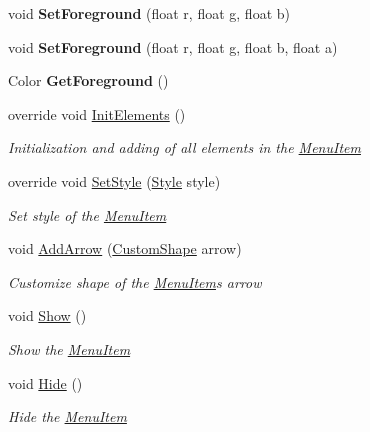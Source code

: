 \begin{DoxyCompactItemize}
void {\bfseries Set\+Foreground} (float r, float g, float b)
\item 
\mbox{\label{class_space_v_i_l_1_1_menu_item_ac29025d8772135b9cdf0e7790e47fe81}} 
void {\bfseries Set\+Foreground} (float r, float g, float b, float a)
\item 
\mbox{\label{class_space_v_i_l_1_1_menu_item_a7aa3ff32dc812b34f88ae7090febd741}} 
Color {\bfseries Get\+Foreground} ()
\item 
override void \mbox{\hyperlink{class_space_v_i_l_1_1_menu_item_a69732e6cf64ca11da0d3beef91e8c086}{Init\+Elements}} ()
\begin{DoxyCompactList}\small\item\em Initialization and adding of all elements in the \mbox{\hyperlink{class_space_v_i_l_1_1_menu_item}{Menu\+Item}} \end{DoxyCompactList}\item 
override void \mbox{\hyperlink{class_space_v_i_l_1_1_menu_item_a836d866b3d92b8217a49ddd19b0a35f5}{Set\+Style}} (\mbox{\hyperlink{class_space_v_i_l_1_1_decorations_1_1_style}{Style}} style)
\begin{DoxyCompactList}\small\item\em Set style of the \mbox{\hyperlink{class_space_v_i_l_1_1_menu_item}{Menu\+Item}} \end{DoxyCompactList}\item 
void \mbox{\hyperlink{class_space_v_i_l_1_1_menu_item_a54c3c774c9108d3bd599b4e464f7fcd1}{Add\+Arrow}} (\mbox{\hyperlink{class_space_v_i_l_1_1_custom_shape}{Custom\+Shape}} arrow)
\begin{DoxyCompactList}\small\item\em Customize shape of the \mbox{\hyperlink{class_space_v_i_l_1_1_menu_item}{Menu\+Item}}\textquotesingle{}s arrow \end{DoxyCompactList}\item 
void \mbox{\hyperlink{class_space_v_i_l_1_1_menu_item_a6580890d0efc3f2a6f075d7a4ac71b1d}{Show}} ()
\begin{DoxyCompactList}\small\item\em Show the \mbox{\hyperlink{class_space_v_i_l_1_1_menu_item}{Menu\+Item}} \end{DoxyCompactList}\item 
void \mbox{\hyperlink{class_space_v_i_l_1_1_menu_item_ae2e42e8ae16b40a8386bbbdb53ccb059}{Hide}} ()
\begin{DoxyCompactList}\small\item\em Hide the \mbox{\hyperlink{class_space_v_i_l_1_1_menu_item}{Menu\+Item}} \end{DoxyCompactList}\end{DoxyCompactItemize}
